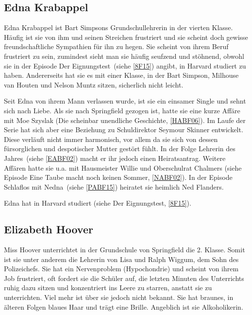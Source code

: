 \subsection{Edna Krabappel}\label{Krabappel}
Edna Krabappel ist Bart Simpsons Grundschullehrerin in der vierten Klasse. Häufig ist sie von ihm und seinen Streichen frustriert und sie scheint doch gewisse freundschaftliche Sympathien für ihn zu hegen. Sie scheint von ihrem Beruf frustriert zu sein, zumindest sieht man sie häufig seufzend und stöhnend, obwohl sie in der Episode \glqq Der Eignungstest\grqq\ (siehe \ref{8F15}) angibt, in Harvard studiert zu haben. Andererseits hat sie es mit einer Klasse, in der Bart Simpson, Milhouse van Houten und Nelson Muntz sitzen, sicherlich nicht leicht.

Seit Edna von ihrem Mann verlassen wurde, ist sie ein einsamer Single und sehnt sich nach Liebe. Als sie nach Springfield gezogen ist, hatte sie eine kurze Affäre mit Moe Szyslak (\glqq Die scheinbar unendliche Geschichte\grqq , \ref{HABF06}). Im Laufe der Serie hat sich aber eine Beziehung zu Schuldirektor Seymour Skinner entwickelt. Diese verläuft nicht immer harmonisch, vor allem da sie sich von dessen fürsorglichen und despotischer Mutter gestört fühlt. In der Folge \glqq Lehrerin des Jahres\grqq\ (siehe \ref{EABF02}) macht er ihr jedoch einen Heiratsantrag. Weitere Affären hatte sie u.a. mit Hausmeister Willie und Oberschulrat Chalmers (siehe Episode \glqq Eine Taube macht noch keinen Sommer\grqq , \ref{NABF02}). In der Episode \glqq Schlaflos mit Nedna\grqq\ (siehe \ref{PABF15}) heiratet sie heimlich Ned Flanders.

Edna hat in Harvard studiert (siehe \glqq Der Eignungstest\grqq, \ref{8F15}).


\subsection{Elizabeth Hoover}
Miss Hoover unterrichtet in der Grundschule von Springfield die 2. Klasse. Somit ist sie unter anderem die Lehrerin von Lisa und Ralph Wiggum, dem Sohn des Polizeichefs. Sie hat ein Nervenproblem (Hypochondrie) und scheint von ihrem Job frustriert, oft fordert sie die Schüler auf, die letzten Minuten des Unterrichts ruhig dazu sitzen und konzentriert ins Leere zu starren, anstatt sie zu unterrichten. Viel mehr ist über sie jedoch nicht bekannt. Sie hat braunes, in älteren Folgen blaues Haar und trägt eine Brille. Angeblich ist sie Alkoholikerin.

